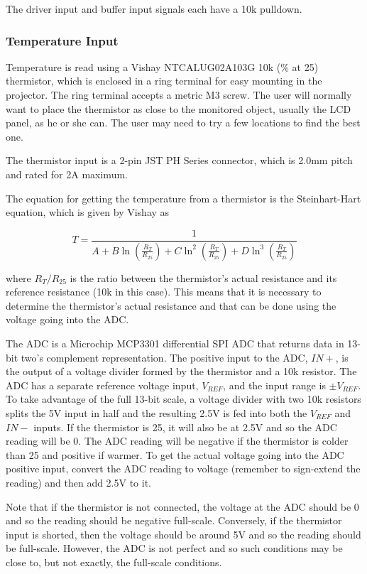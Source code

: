 \documentclass{article}
\begin{document}
The driver input and buffer input signals each have a 10k\textOmega{} pulldown.

\subsubsection{Temperature Input} \label{sssec:TempInput}
Temperature is read using a Vishay NTCALUG02A103G 10k (\% at 25\textcelsius) thermistor,
which is enclosed in a ring terminal for easy mounting in the projector.  The ring terminal accepts
a metric M3 screw.  The user will normally want to place the thermistor as close to the monitored
object, usually the LCD panel, as he or she can.  The user may need to try a few locations to find
the best one.

The thermistor input is a 2-pin JST PH Series connector, which is 2.0mm pitch and rated for 2A maximum.

The equation for getting the temperature from a thermistor is the Steinhart-Hart equation, which is
given by Vishay as

\[
T = \frac{1}{A + B\ln(\frac{R_T}{R_{25}}) + C\ln^2(\frac{R_T}{R_{25}}) + D\ln^3(\frac{R_T}{R_{25}})}
\]

where $R_T/R_{25}$ is the ratio between the thermistor's actual resistance and its reference
resistance (10k\textOmega{} in this case).  This means that it is necessary to determine the
thermistor's actual resistance and that can be done using the voltage going into the ADC.

The ADC is a Microchip MCP3301 differential SPI ADC that returns data in 13-bit two's complement
representation.  The positive input to the ADC, $IN+$, is the output of a voltage divider formed by
the thermistor and a 10k\textOmega{} resistor.  The ADC has a separate reference voltage input,
$V_{REF}$, and the input range is $\pm V_{REF}$.  To take advantage of the full 13-bit scale, a
voltage divider with two 10k\textOmega{} resistors splits the 5V input in half and the resulting
2.5V is fed into both the $V_{REF}$ and $IN-$ inputs.  If the thermistor is 25\textcelsius{}, it
will also be at 2.5V and so the ADC reading will be 0.  The ADC reading will be negative if the
thermistor is colder than 25\textcelsius{} and positive if warmer.  To get the actual voltage going
into the ADC positive input, convert the ADC reading to voltage (remember to sign-extend the
reading) and then add 2.5V to it.

Note that if the thermistor is not connected, the voltage at the ADC should be 0 and so the reading
should be negative full-scale.  Conversely, if the thermistor input is shorted, then the voltage
should be around 5V and so the reading should be full-scale.  However, the ADC is not perfect and so
such conditions may be close to, but not exactly, the full-scale conditions.
\end{document}
